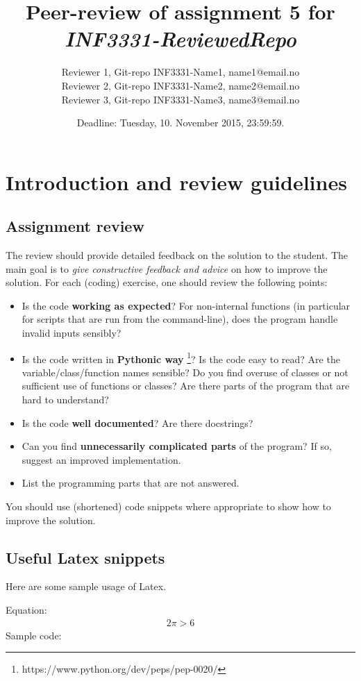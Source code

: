 \documentclass[a4paper]{article}
\title{Peer-review of assignment 5 for \textit{INF3331-ReviewedRepo}}
\author{Reviewer 1, Git-repo INF3331-Name1, {name1@email.no} \\
 		Reviewer 2, Git-repo INF3331-Name2, {name2@email.no} \\
		Reviewer 3, Git-repo INF3331-Name3, {name3@email.no}}
\date{Deadline: Tuesday, 10. November 2015, 23:59:59.}
\begin{document}
\maketitle

\section{Introduction and review guidelines}

\subsection{Assignment review}\label{sec:general_review}

The review should provide detailed feedback on the solution to the student. The main goal is to \emph{give constructive feedback and advice} on how to improve the solution. For each (coding) exercise, one should review the following points:

\begin{itemize}
  \item Is the code \textbf{working as expected}? For non-internal functions (in particular for scripts that are run from the command-line), does the program handle invalid inputs sensibly?
  \item Is the code written in \textbf{Pythonic way} \footnote{https://www.python.org/dev/peps/pep-0020/}? Is the code easy to read? Are the variable/class/function names sensible? Do you find overuse of classes or not sufficient use of functions or classes? Are there parts of the program that are hard to understand? 
  \item Is the code \textbf{well documented}? Are there docstrings?
  \item Can you find \textbf{unnecessarily complicated parts} of the program? If so, suggest an improved implementation.
  \item List the programming parts that are not answered.
\end{itemize}
You should use (shortened) code snippets where appropriate to show how to improve the solution. 


\subsection{Useful Latex snippets}
Here are some sample usage of Latex.

\noindent
Equation:
\begin{align}
2 \pi > 6
\end{align}
Sample code:
\end{document}
